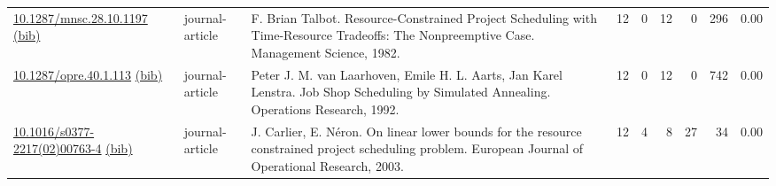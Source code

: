 {\begin{longtable}{p{5cm}lp{11cm}rrrrrr}
\href{http://dx.doi.org/10.1287/mnsc.28.10.1197}{10.1287/mnsc.28.10.1197} \href{https://www.doi2bib.org/bib/10.1287/mnsc.28.10.1197}{(bib)} & journal-article & F. Brian Talbot. Resource-Constrained Project Scheduling with Time-Resource Tradeoffs: The Nonpreemptive Case. Management Science, 1982. & 12 & 0 & 12 & 0 & 296 &  0.00\\
\href{http://dx.doi.org/10.1287/opre.40.1.113}{10.1287/opre.40.1.113} \href{https://www.doi2bib.org/bib/10.1287/opre.40.1.113}{(bib)} & journal-article & Peter J. M. van Laarhoven, Emile H. L. Aarts, Jan Karel Lenstra. Job Shop Scheduling by Simulated Annealing. Operations Research, 1992. & 12 & 0 & 12 & 0 & 742 &  0.00\\
\href{http://dx.doi.org/10.1016/s0377-2217(02)00763-4}{10.1016/s0377-2217(02)00763-4} \href{https://www.doi2bib.org/bib/10.1016/s0377-2217(02)00763-4}{(bib)} & journal-article & J. Carlier, E. Néron. On linear lower bounds for the resource constrained project scheduling problem. European Journal of Operational Research, 2003. & 12 & 4 & 8 & 27 & 34 &  0.00\\
\end{longtable}
}

